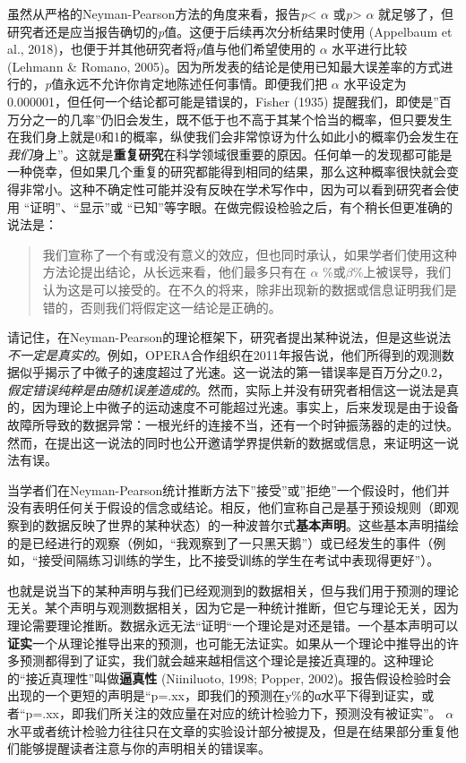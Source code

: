 \documentclass[
  letterpaper,
  DIV=11,
  numbers=noendperiod]{scrreprt}
\begin{document}
虽然从严格的Neyman-Pearson方法的角度来看，报告\emph{p}\textless{}
\(\alpha\) 或\emph{p}\textgreater{} \(\alpha\)
就足够了，但研究者还是应当报告确切的\emph{p}值。这便于后续再次分析结果时使用
(Appelbaum et al., 2018)，也便于并其他研究者将\emph{p}值与他们希望使用的
\(\alpha\) 水平进行比较 (Lehmann \& Romano,
2005)。因为所发表的结论是使用已知最大误差率的方式进行的，\emph{p}值永远不允许你肯定地陈述任何事情。即便我们把
\(\alpha\) 水平设定为0.000001，但任何一个结论都可能是错误的，Fisher
(1935)
提醒我们，即使是''百万分之一的几率''仍旧会发生，既不低于也不高于其某个恰当的概率，但只要发生在我们身上就是0和1的概率，纵使我们会非常惊讶为什么如此小的概率仍会发生在\emph{我们}身上''。这就是\textbf{重复研究}在科学领域很重要的原因。任何单一的发现都可能是一种侥幸，但如果几个重复的研究都能得到相同的结果，那么这种概率很快就会变得非常小。这种不确定性可能并没有反映在学术写作中，因为可以看到研究者会使用
``证明''、``显示''或
``已知''等字眼。在做完假设检验之后，有个稍长但更准确的说法是：

\begin{quote}
我们宣称了一个有或没有意义的效应，但也同时承认，如果学者们使用这种方法论提出结论，从长远来看，他们最多只有在
\(\alpha\)
\%或\(\beta\)\%上被误导，我们认为这是可以接受的。在不久的将来，除非出现新的数据或信息证明我们是错的，否则我们将假定这一结论是正确的。
\end{quote}

请记住，在Neyman-Pearson的理论框架下，研究者提出某种说法，但是这些说法\emph{不一定是真实的}。例如，OPERA合作组织在2011年报告说，他们所得到的观测数据似乎揭示了中微子的速度超过了光速。这一说法的第一错误率是百万分之0.2，\emph{假定错误纯粹是由随机误差造成的}。然而，实际上并没有研究者相信这一说法是真的，因为理论上中微子的运动速度不可能超过光速。事实上，后来发现是由于设备故障所导致的数据异常：一根光纤的连接不当，还有一个时钟振荡器的走的过快。然而，在提出这一说法的同时也公开邀请学界提供新的数据或信息，来证明这一说法有误。

当学者们在Neyman-Pearson统计推断方法下''接受''或''拒绝''一个假设时，他们并没有表明任何关于假设的信念或结论。相反，他们宣称自己是基于预设规则（即观察到的数据反映了世界的某种状态）的一种波普尔式\textbf{基本声明}。这些基本声明描绘的是已经进行的观察（例如，``我观察到了一只黑天鹅''）或已经发生的事件（例如，``接受间隔练习训练的学生，比不接受训练的学生在考试中表现得更好''）。

也就是说当下的某种声明与我们已经观测到的数据相关，但与我们用于预测的理论无关。某个声明与观测数据相关，因为它是一种统计推断，但它与理论无关，因为理论需要理论推断。数据永远无法``证明``一个理论是对还是错。一个基本声明可以\textbf{证实}一个从理论推导出来的预测，也可能无法证实。如果从一个理论中推导出的许多预测都得到了证实，我们就会越来越相信这个理论是接近真理的。这种理论的``接近真理性''叫做\textbf{逼真性}
(Niiniluoto, 1998; Popper,
2002)。报告假设检验时会出现的一个更短的声明是``p=.xx，即我们的预测在y\%的α水平下得到证实，或者``p=.xx，即我们所关注的效应量在对应的统计检验力下，预测没有被证实''。
\(\alpha\)
水平或者统计检验力往往只在文章的实验设计部分被提及，但是在结果部分重复他们能够提醒读者注意与你的声明相关的错误率。
\end{document}
